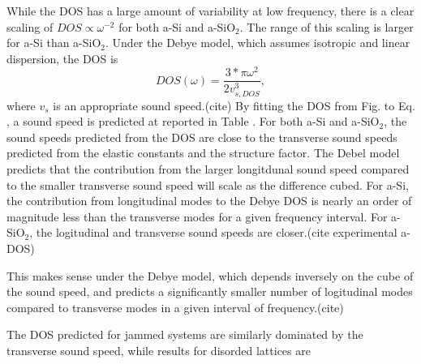 \documentclass[aps,prb,twocolumn,superscriptaddress,footinbib,amsmath,amssymb,floatfix]{revtex4}
\begin{document}
While the DOS has a large amount of variability at low frequency, 
there is a clear scaling of $DOS \propto \omega^{-2}$ for both 
a-Si and a-SiO$_2$. The range of this 
scaling is larger for a-Si than a-SiO$_2$. 
Under the Debye model, which assumes isotropic and linear dispersion, 
the DOS is
\begin{equation}\label{EQ:DOS_debye}
DOS(\omega) = \frac{3*\pi\omega^2}{2v_{s,DOS}^3},
\end{equation}
where $v_s$ is an appropriate sound speed.(cite) By fitting the DOS 
from Fig. to Eq. , a sound speed is predicted at reported in Table . 
For both a-Si and a-SiO$_2$, the sound speeds predicted from the DOS 
are close to the transverse sound speeds predicted from the elastic 
constants and the structure factor. The Debel model predicts that 
the contribution from the larger longitdunal sound speed compared 
to the smaller transverse sound speed will scale as the difference 
cubed. For a-Si, 
the contribution from longitudinal modes to the Debye DOS is nearly 
an order of magnitude less than the transverse modes for a given 
frequency interval. For a-SiO$_2$, the logitudinal and transverse 
sound speeds are closer.(cite experimental a-DOS)

This makes sense under the Debye model, which depends inversely on the 
cube of the sound speed, and predicts a significantly smaller number 
of logitudinal modes compared to transverse modes in a given interval 
of frequency.(cite) 

The DOS predicted for jammed systems are similarly dominated by 
the transverse sound speed,\cite{} while results for disorded lattices 
are
\end{document}
